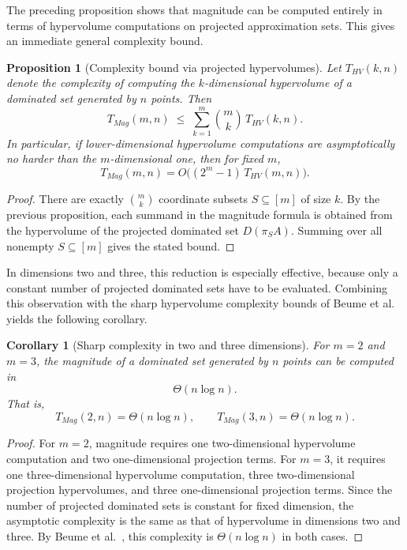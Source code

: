 \documentclass{article}
\def\HV{HV}%
\def\Mag{Mag}%
\newtheorem{proposition}[theorem]{Proposition}
\newtheorem{corollary}[theorem]{Corollary}
\theoremstyle{definition}
\newcommand{\Mag}{\operatorname{Mag}}
\newcommand{\HV}{\operatorname{HV}}
\newcommand{\1}{\mathbf{1}}
\begin{document}
The preceding proposition shows that magnitude can be computed entirely in terms of hypervolume computations on projected approximation sets. This gives an immediate general complexity bound.

\begin{proposition}[Complexity bound via projected hypervolumes]
Let \(T_{\HV}(k,n)\) denote the complexity of computing the \(k\)-dimensional hypervolume of a dominated set generated by \(n\) points. Then
\[
T_{\Mag}(m,n)\;\le\;\sum_{k=1}^{m}\binom{m}{k}\,T_{\HV}(k,n).
\]
In particular, if lower-dimensional hypervolume computations are asymptotically no harder than the \(m\)-dimensional one, then for fixed \(m\),
\[
T_{\Mag}(m,n)=O\!\bigl((2^m-1)\,T_{\HV}(m,n)\bigr).
\]
\end{proposition}

\begin{proof}
There are exactly \(\binom{m}{k}\) coordinate subsets \(S\subseteq [m]\) of size \(k\). By the previous proposition, each summand in the magnitude formula is obtained from the hypervolume of the projected dominated set \(D(\pi_S A)\). Summing over all nonempty \(S\subseteq [m]\) gives the stated bound.
\end{proof}

In dimensions two and three, this reduction is especially effective, because only a constant number of projected dominated sets have to be evaluated. Combining this observation with the sharp hypervolume complexity bounds of Beume et al.~\cite{BeumeEtAl2009} yields the following corollary.

\begin{corollary}[Sharp complexity in two and three dimensions]
For \(m=2\) and \(m=3\), the magnitude of a dominated set generated by \(n\) points can be computed in
\[
\Theta(n\log n).
\]
That is,
\[
T_{\Mag}(2,n)=\Theta(n\log n),
\qquad
T_{\Mag}(3,n)=\Theta(n\log n).
\]
\end{corollary}

\begin{proof}
For \(m=2\), magnitude requires one two-dimensional hypervolume computation and two one-dimensional projection terms. For \(m=3\), it requires one three-dimensional hypervolume computation, three two-dimensional projection hypervolumes, and three one-dimensional projection terms. Since the number of projected dominated sets is constant for fixed dimension, the asymptotic complexity is the same as that of hypervolume in dimensions two and three. By Beume et al.~\cite{BeumeEtAl2009}, this complexity is \(\Theta(n\log n)\) in both cases.
\end{proof}
\end{document}
